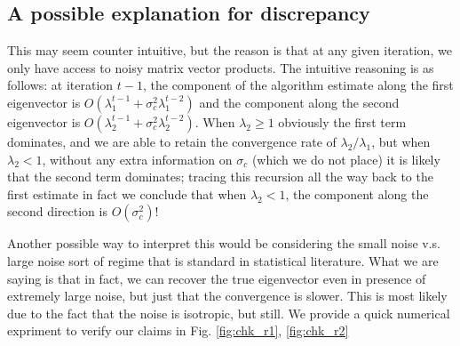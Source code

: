 \documentclass[10pt]{article}
\begin{document}
{\color{teal} 
\subsection{A possible explanation for discrepancy}\label{sec:expl}
This may seem counter intuitive, but the reason is that at any given iteration, we only have access to noisy matrix vector products. The intuitive reasoning is as follows: at iteration $t-1$, the component of the algorithm estimate along the first eigenvector is $O( \lambda_1^{t-1} + \sigma_c^2 \lambda_1^{t-2})$ and the component along the second eigenvector is $O( \lambda_2^{t-1} + \sigma_c^2 \lambda_2^{t-2})$. When $\lambda_2 \geq 1$ obviously the first term dominates, and we are able to retain the convergence rate of $\lambda_2/\lambda_1$, but when $\lambda_2 <1$, without any extra information on $\sigma_c$ (which we do not place) it is likely that the second term dominates; tracing this recursion all the way back to the first estimate in fact we conclude that when $\lambda_2 < 1$, the component along the second direction is $O(\sigma_c^2)$! 

Another possible way to interpret this would be considering the small noise v.s. large noise sort of regime that is standard in statistical literature. What we are saying is that in fact, we can recover the true eigenvector even in presence of extremely large noise, but just that the convergence is slower. This is most likely due to the fact that the noise is isotropic, but still. 
We provide a quick numerical expriment to verify our claims in Fig. \ref{fig:chk_r1}, \ref{fig:chk_r2}
}
\end{document}
